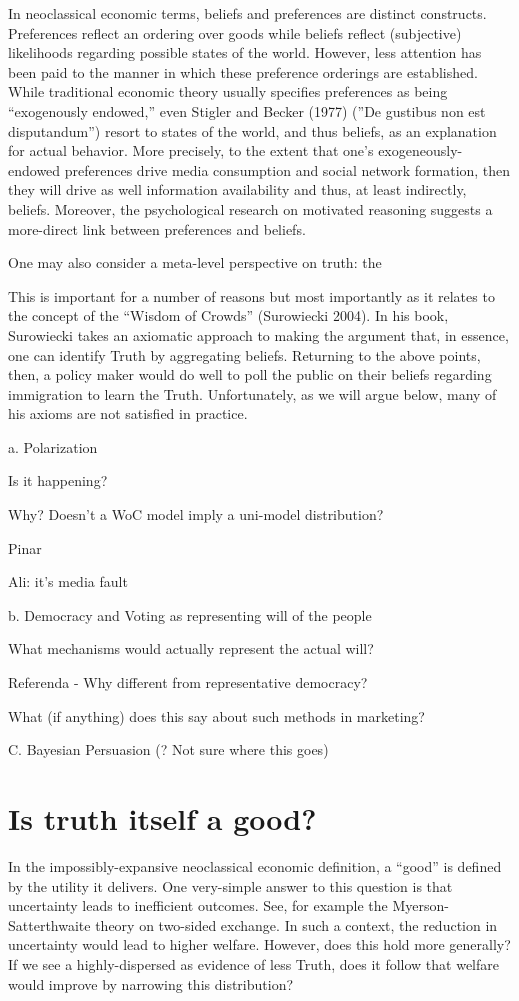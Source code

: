 \documentclass{article}
\begin{document}
\begin{spacing}{2}
In neoclassical economic terms, beliefs and preferences are distinct constructs.  Preferences reflect an ordering over goods while beliefs reflect (subjective) likelihoods regarding possible states of the world. However, less attention has been paid to the manner in which these preference orderings are established. While traditional economic theory usually specifies preferences as being ``exogenously endowed,'' even Stigler and Becker (1977) (''De gustibus non est disputandum'') resort to states of the world, and thus beliefs, as an explanation for actual behavior. More precisely, to the extent that one's exogeneously-endowed preferences drive media consumption and social network formation, then they will drive as well information availability and thus, at least indirectly, beliefs. Moreover, the psychological research on motivated reasoning suggests a more-direct link between preferences and beliefs.

One may also consider a meta-level perspective on truth: the 


This is important for a number of reasons but most importantly as it relates to the concept of the ``Wisdom of Crowds'' (Surowiecki 2004). In his book, Surowiecki takes an axiomatic approach to making the argument that, in essence, one can identify Truth by aggregating beliefs. Returning to the above points, then, a policy maker would do well to poll the public on their beliefs regarding immigration to learn the Truth. Unfortunately, as we will argue below, many of his axioms are not satisfied in practice.

a. Polarization
\item Is it happening?
\item Why?
Doesn't a WoC model imply a uni-model distribution?
\item Pinar
\item Ali: it's media fault

b. Democracy and Voting as representing will of the people
\item What mechanisms would actually represent the actual will?
\item Referenda - Why different from representative democracy?
\item What (if anything) does this say about such methods in marketing?

C. Bayesian Persuasion (? Not sure where this goes)

\section{Is truth itself a good?}\label{Sec: truth_good}
In the impossibly-expansive neoclassical economic definition, a ``good'' is defined by the utility it delivers. One very-simple answer to this question is that uncertainty leads to inefficient outcomes. See, for example the Myerson-Satterthwaite theory on two-sided exchange. In such a context, the reduction in uncertainty would lead to higher welfare. However, does this hold more generally? If we see a highly-dispersed  as evidence of less Truth, does it follow that welfare would improve by narrowing this distribution?


\end{spacing}
\end{document}
